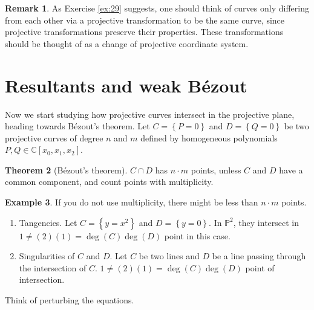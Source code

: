 \documentclass{article}
\newcommand{\C}{\mathbb{C}}
\renewcommand{\P}{\mathbb{P}}
\newcommand{\rb}[1]{\left( #1 \right)}
\renewcommand{\sb}[1]{\left[ #1 \right]}
\newcommand{\cb}[1]{\left\{ #1 \right\}}
\theoremstyle{definition}\newtheorem{definition}{Definition}[section]
\theoremstyle{definition}\newtheorem{notation}[definition]{Notation}
\theoremstyle{definition}\newtheorem{remark}[definition]{Remark}
\theoremstyle{definition}\newtheorem{example}[definition]{Example}
\theoremstyle{definition}\newtheorem{fact}{Fact}
\theoremstyle{definition}\newtheorem{exercise}{Exercise}
\newtheorem{theorem}[definition]{Theorem}
\begin{document}
\begin{remark}
As Exercise \ref{ex:29} suggests, one should think of curves only differing from each other via a projective transformation to be the same curve, since projective transformations preserve their properties. These transformations should be thought of as a change of projective coordinate system.
\end{remark}


\section{Resultants and weak Bézout}

Now we start studying how projective curves intersect in the projective plane, heading towards Bézout's theorem. Let $ C = \cb{P = 0} $ and $ D = \cb{Q = 0} $ be two projective curves of degree $ n $ and $ m $ defined by homogeneous polynomials $ P, Q \in \C\sb{x_0, x_1, x_2} $.

\begin{theorem}[Bézout's theorem]
$ C \cap D $ has $ n \cdot m $ points, unless $ C $ and $ D $ have a common component, and count points with multiplicity.
\end{theorem}

\begin{example}
If you do not use multiplicity, there might be less than $ n \cdot m $ points.
\begin{enumerate}
\item Tangencies. Let $ C = \cb{y = x^2} $ and $ D = \cb{y = 0} $. In $ \P^2 $, they intersect in $ 1 \ne \rb{2}\rb{1} = \deg\rb{C}\deg\rb{D} $ point in this case.
\item Singularities of $ C $ and $ D $. Let $ C $ be two lines and $ D $ be a line passing through the intersection of $ C $. $ 1 \ne \rb{2}\rb{1} = \deg\rb{C}\deg\rb{D} $ point of intersection.
\end{enumerate}
Think of perturbing the equations.
\end{example}
\end{document}
